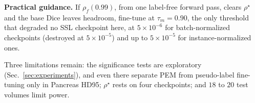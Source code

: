 \documentclass[conference]{IEEEtran}
\begin{document}
\noindent\textbf{Practical guidance.} If $\rho_f(0.99)$, from one label-free forward pass, clears $\rho^\star$ and the base Dice leaves headroom, fine-tune at $\tau_m=0.90$, the only threshold that degraded no SSL checkpoint here, at $5\times10^{-6}$ for batch-normalized checkpoints (destroyed at $5\times10^{-5}$) and up to $5\times10^{-5}$ for instance-normalized ones.

Three limitations remain: the significance tests are exploratory (Sec.~\ref{sec:experiments}), and even there separate PEM from pseudo-label fine-tuning only in Pancreas HD95; $\rho^\star$ rests on four checkpoints; and $18$ to $20$ test volumes limit power.



\end{document}
